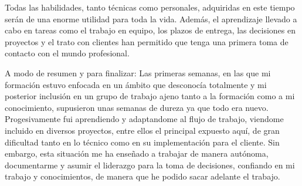 Todas las habilidades, tanto técnicas como personales, adquiridas en este tiempo serán de una enorme utilidad para toda la vida. Además, el aprendizaje llevado a cabo en tareas como el trabajo en equipo, los plazos de entrega, las decisiones en proyectos y el trato con clientes han permitido que tenga una primera toma de contacto con el mundo profesional.

A modo de resumen y para finalizar: Las primeras semanas, en las que mi formación estuvo enfocada en un ámbito que desconocía totalmente y mi posterior inclusión en un grupo de trabajo ajeno tanto a la formación como a mi conocimiento, supusieron unas semanas de dureza ya que todo era nuevo. Progesivamente fui aprendiendo y adaptandome al flujo de trabajo, viendome incluido en diversos proyectos, entre ellos el principal expuesto aquí, de gran dificultad tanto en lo técnico como en su implementación para el cliente. Sin embargo, esta situación me ha enseñado a trabajar de manera autónoma, documentarme y asumir el liderazgo para la toma de decisiones, confiando en mi trabajo y conocimientos, de manera que he podido sacar adelante el trabajo.
%
%
%